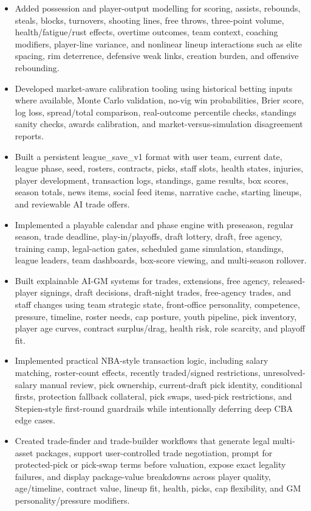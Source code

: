 \documentclass[10.5pt,letterpaper]{article}
\begin{document}
\begin{itemize}
\item Added possession and player-output modelling for scoring, assists, rebounds, steals, blocks, turnovers, shooting lines, free throws, three-point volume, health/fatigue/rust effects, overtime outcomes, team context, coaching modifiers, player-line variance, and nonlinear lineup interactions such as elite spacing, rim deterrence, defensive weak links, creation burden, and offensive rebounding.
\item Developed market-aware calibration tooling using historical betting inputs where available, Monte Carlo validation, no-vig win probabilities, Brier score, log loss, spread/total comparison, real-outcome percentile checks, standings sanity checks, awards calibration, and market-versus-simulation disagreement reports.
\item Built a persistent league\_save\_v1 format with user team, current date, league phase, seed, rosters, contracts, picks, staff slots, health states, injuries, player development, transaction logs, standings, game results, box scores, season totals, news items, social feed items, narrative cache, starting lineups, and reviewable AI trade offers.
\item Implemented a playable calendar and phase engine with preseason, regular season, trade deadline, play-in/playoffs, draft lottery, draft, free agency, training camp, legal-action gates, scheduled game simulation, standings, league leaders, team dashboards, box-score viewing, and multi-season rollover.
\item Built explainable AI-GM systems for trades, extensions, free agency, released-player signings, draft decisions, draft-night trades, free-agency trades, and staff changes using team strategic state, front-office personality, competence, pressure, timeline, roster needs, cap posture, youth pipeline, pick inventory, player age curves, contract surplus/drag, health risk, role scarcity, and playoff fit.
\item Implemented practical NBA-style transaction logic, including salary matching, roster-count effects, recently traded/signed restrictions, unresolved-salary manual review, pick ownership, current-draft pick identity, conditional firsts, protection fallback collateral, pick swaps, used-pick restrictions, and Stepien-style first-round guardrails while intentionally deferring deep CBA edge cases.
\item Created trade-finder and trade-builder workflows that generate legal multi-asset packages, support user-controlled trade negotiation, prompt for protected-pick or pick-swap terms before valuation, expose exact legality failures, and display package-value breakdowns across player quality, age/timeline, contract value, lineup fit, health, picks, cap flexibility, and GM personality/pressure modifiers.

\end{itemize}
\end{document}
